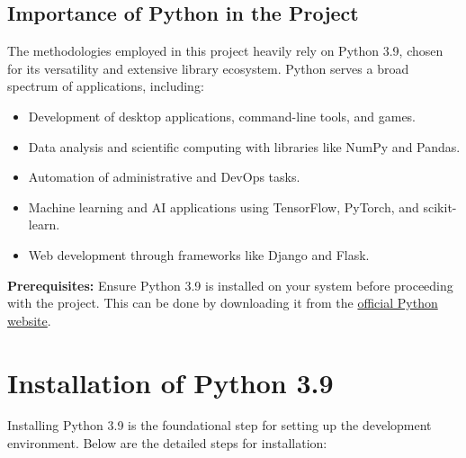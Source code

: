 \subsection{Importance of Python in the Project}

The methodologies employed in this project heavily rely on Python 3.9, chosen for its versatility and extensive library ecosystem. Python serves a broad spectrum of applications, including:
\begin{itemize}
	\item Development of desktop applications, command-line tools, and games.
	\item Data analysis and scientific computing with libraries like NumPy and Pandas.
	\item Automation of administrative and DevOps tasks.
	\item Machine learning and AI applications using TensorFlow, PyTorch, and scikit-learn.
	\item Web development through frameworks like Django and Flask.
\end{itemize}

\textbf{Prerequisites:} Ensure Python 3.9 is installed on your system before proceeding with the project. This can be done by downloading it from the \href{https://www.python.org/downloads/}{official Python website}.


\section{Installation of Python 3.9}

Installing Python 3.9 is the foundational step for setting up the development environment. Below are the detailed steps for installation:


